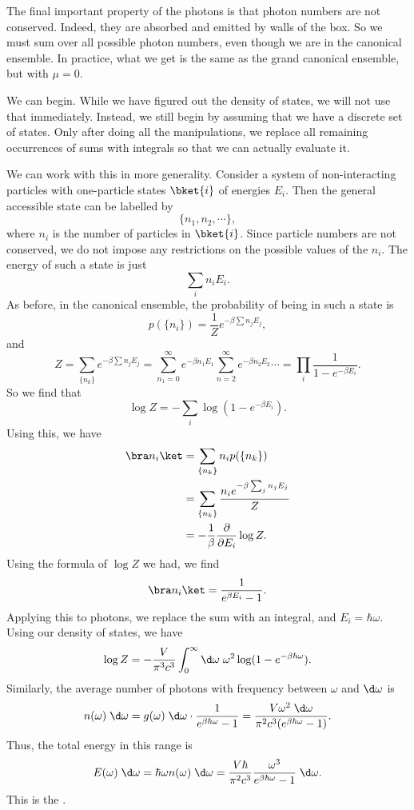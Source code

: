 \documentclass[a4paper]{article}
\begin{document}
The final important property of the photons is that photon numbers are not conserved. Indeed, they are absorbed and emitted by walls of the box. So we must sum over all possible photon numbers, even though we are in the canonical ensemble. In practice, what we get is the same as the grand canonical ensemble, but with $\mu = 0$.

We can begin. While we have figured out the density of states, we will not use that immediately. Instead, we still begin by assuming that we have a discrete set of states. Only after doing all the manipulations, we replace all remaining occurrences of sums with integrals so that we can actually evaluate it.

We can work with this in more generality. Consider a system of non-interacting particles with one-particle states $\bket{i}$ of energies $E_i$. Then the general accessible state can be labelled by
\[
  \{n_1, n_2, \cdots\},
\]
where $n_i$ is the number of particles in $\bket{i}$. Since particle numbers are not conserved, we do not impose any restrictions on the possible values of the $n_i$. The energy of such a state is just
\[
  \sum_i n_i E_i.
\]
As before, in the canonical ensemble, the probability of being in such a state is
\[
  p(\{n_i\}) = \frac{1}{Z} e^{-\beta \sum n_j E_j},
\]
and
\[
  Z = \sum_{\{n_k\}} e^{-\beta \sum n_j E_j} = \sum_{n_1 = 0}^\infty e^{-\beta n_1 E_1} \sum_{n = 2}^\infty e^{-\beta n_2 E_2} \cdots = \prod_i \frac{1}{1 - e^{-\beta E_i}}.
\]
So we find that
\[
  \log Z = - \sum_i \log (1 - e^{-\beta E_i}).
\]
Using this, we have
\begin{align*}
  \bra n_i\ket &= \sum_{\{n_k\}} n_i p (\{n_k\}) \\
  &= \sum_{\{n_k\}} \frac{n_i e^{-\beta \sum_j n_j E_j}}{Z}\\
  &= - \frac{1}{\beta} \frac{\partial}{\partial E_i} \log Z.
\end{align*}
Using the formula of $\log Z$ we had, we find
\[
  \bra n_i\ket = \frac{1}{e^{\beta E_i} - 1}.
\]
Applying this to photons, we replace the sum with an integral, and $E_i = \hbar \omega$. Using our density of states, we have
\[
  \log Z = - \frac{V}{\pi^3 c^3} \int_0^\infty \d \omega\; \omega^2 \log(1 - e^{-\beta \hbar \omega}).
\]
Similarly, the average number of photons with frequency between $\omega$ and $\d \omega$ is
\[
  n(\omega)\; \d \omega = g(\omega) \;\d \omega \cdot \frac{1}{e^{\beta \hbar \omega} - 1} = \frac{V \omega^2\;\d \omega}{\pi^2 c^3(e^{\beta\hbar\omega} - 1)}.
\]
Thus, the total energy in this range is
\[
  E(\omega) \;\d \omega = \hbar \omega n(\omega) \;\d \omega = \frac{V \hbar}{\pi^2 c^3} \frac{\omega^3}{e^{\beta \hbar \omega} - 1}\;\d \omega.
\]
This is the .
\end{document}
